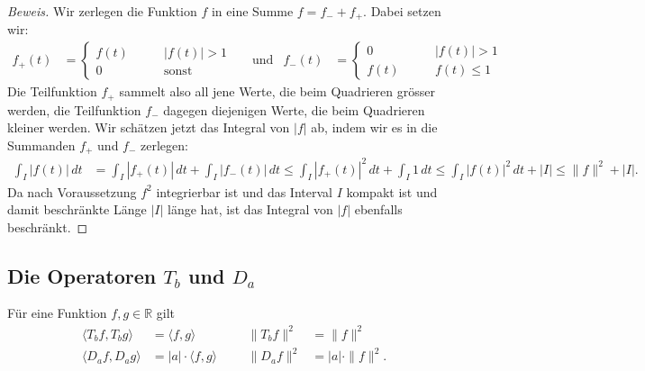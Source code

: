 \begin{proof}[Beweis]
Wir zerlegen die Funktion $f$ in eine Summe $f=f_-+f_+$. 
Dabei setzen wir:
\begin{align*}
f_+(t) &= 
\begin{cases}
f(t)&\qquad |f(t)| > 1\\
0   &\qquad\text{sonst}
\end{cases}
&&\text{und}
&
f_-(t)
&=
\begin{cases}
0   &\qquad |f(t)| > 1\\
f(t)&\qquad f(t)\le 1
\end{cases}
\end{align*}
Die Teilfunktion $f_+$ sammelt also all jene Werte, die beim Quadrieren
grösser werden, die Teilfunktion $f_-$ dagegen diejenigen Werte, die
beim Quadrieren kleiner werden.
Wir schätzen jetzt das Integral von $|f|$ ab, indem wir es in die Summanden
$f_+$ und $f_-$ zerlegen:
\begin{align*}
\int_I |f(t)|\,dt
&=
\int_I |f_+(t)|\,dt + \int_I |f_-(t)|\,dt
\le
\int_I |f_+(t)|^2\,dt + \int_I 1\,dt
\le 
\int_I |f(t)|^2\,dt + |I|
\le \|f\|^2 + |I|.
\end{align*}
Da nach Voraussetzung $f^2$ integrierbar ist und das Interval $I$ kompakt ist
und damit beschränkte Länge $|I|$ länge hat, ist das Integral von $|f|$
ebenfalls beschränkt.
\end{proof}

\subsection{Die Operatoren $T_b$ und $D_a$}

\begin{satz}
Für eine Funktion $f,g\in\mathbb R$ gilt
\[
\begin{aligned}
\langle T_bf,T_bg\rangle
&=
\langle f,g\rangle
&&
&
\| T_bf\|^2 &= \|f\|^2
\\
\langle D_af,D_ag\rangle
&=
|a|\cdot
\langle f,g\rangle
&&
&
\| D_af\|^2 &= |a|\cdot \|f\|^2.
\end{aligned}
\]
\end{satz}


